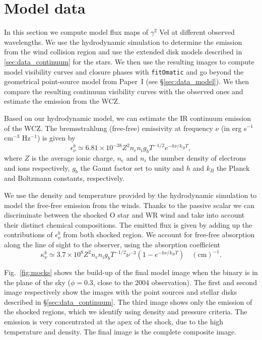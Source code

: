 \documentclass[usenatbib]{mnras}%
\begin{document}
\section{Model data}\label{sec:mock_data}


In this section we  compute model flux maps of $\gamma^2$ Vel at different observed wavelengths. We use the hydrodynamic simulation to determine the emission from the wind collision region and use the extended disk models described in \ref{sec:data_continuum} for the stars. We then use the resulting images to compute model visibility curves and closure phases with \texttt{fitOmatic}  and go beyond the geometrical point-source model from Paper~I (see \S\ref{sec:data_model}). We then compare the resulting continuum visibility curves with the observed ones  and estimate  the emission from the WCZ.



Based on our hydrodynamic model, we can estimate the IR continuum emission of the WCZ.  The bremsstrahlung (free-free) emissivity at frequency $\nu$ (in erg s$^{-1}$ cm$^{-3}$ Hz$^{-1}$) is given by
\begin{equation}
\label{emissivity}
\epsilon_{\nu}^b\simeq 6.81 \times 10^{-38} Z^2 n_e n_i g_b  T^{-1/2}e^{-h\nu/k_B T} ,
\end{equation}
where $Z$ is the average ionic charge, $n_e$ and $n_i$ the number density of electrons and ions respectively, $g_b$ the Gaunt factor set to unity and $h$ and $k_B$ the Planck and Boltzmann constants, respectively. 

We use the density and temperature provided by the hydrodynamic simulation to model the free-free  emission from the winds. Thanks to the passive scalar we can discriminate between the shocked O star and WR wind and take into account their distinct chemical compositions. The emitted flux is given by adding up the contributions of $\epsilon_{\nu}^b$ from both shocked region. We account for free-free absorption along the line of sight to the observer, using the absorption coefficient 
\begin{equation}
\kappa^b_{\nu} \simeq 3.7 \times 10^8 Z^2 n_e n_i g_b T^{-1/2}\nu^{-3}(1-e^{-h \nu/k_B T}) \quad \mathrm{(cm)}^{-1}.
\end{equation}

Fig.~\ref{fig:mocks} shows the build-up of the final model image when the binary is in the plane of the sky ($\phi=0.3$, close to the 2004 observation). The first and second image respectively show the images with the point sources and stellar disks described in \S\ref{sec:data_continuum}. The third image shows only the emission of the shocked regions, which we identify using density and pressure criteria.  The emission is very concentrated at the apex of the shock, due to the high temperature and density.  The final image is the complete composite image.
\end{document}
